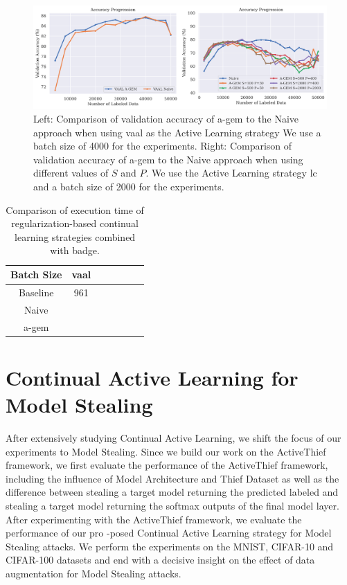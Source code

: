 \begin{figure}[h]
    \centering
    \includegraphics[width=\linewidth]{images/results_CAL/AGEM_plots.png}
    \caption[Continual Active Learning Custom Replay strategy]{Left: Comparison of validation accuracy of \gls{a-gem} to the Naive approach when using \gls{vaal} as the Active Learning strategy We use a batch size of 4000 for the experiments. Right: Comparison of validation accuracy of \gls{a-gem}
     to the Naive approach when using different values of $S$ and $P$. We use the Active Learning strategy \gls{lc} and a batch size of 2000 for the experiments.}
    \label{fig:Evaluation:Results:CAL:AGEM}
\end{figure}


\begin{table}[h]
    \centering
    \begin{tabular}{c | c c c c c c} 
        Batch Size & \gls{vaal}\\ 
        \hline 
        Baseline & 961 \\
        Naive &  \\
        \gls{a-gem} & \\
    \end{tabular}
    \caption{Comparison of execution time of regularization-based continual learning strategies
    combined with \gls{badge}.}
    \label{fig:Evaluation:CAL:VAAL_AGEM_Time}
\end{table}

\section{Continual Active Learning for Model Stealing}
\label{sec:Evaluation:Results:MS}
After extensively studying Continual Active Learning, we shift the focus of our experiments to Model Stealing. Since we build our work on the ActiveThief framework, we first evaluate the performance of the ActiveThief framework, including the influence of Model Architecture and
Thief Dataset as well as the difference between stealing a target model returning the predicted labeled and stealing a target model returning the softmax outputs of the final model layer. After experimenting with the ActiveThief framework, we evaluate the performance of our pro
-posed Continual Active Learning strategy for Model Stealing attacks. We perform the experiments on the MNIST, CIFAR-10 and CIFAR-100 datasets and end with a decisive insight on the effect of data augmentation for Model Stealing attacks. \par


